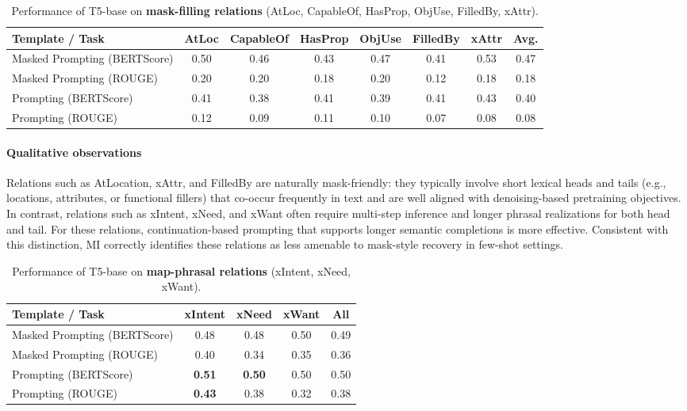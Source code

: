 \documentclass{i4c-en}
\begin{document}
	
	
	\begin{table}[t]
		\centering
		\small
		\begin{tabular}{l|cccccc|c}
			\toprule
			\textbf{Template / Task} & AtLoc & CapableOf & HasProp & ObjUse & FilledBy & xAttr & Avg. \\
			\midrule
			Masked Prompting (BERTScore) & 0.50 & 0.46 & 0.43 & 0.47 & 0.41 & 0.53 & 0.47 \\
			Masked Prompting (ROUGE)     & 0.20 & 0.20 & 0.18 & 0.20 & 0.12 & 0.18 & 0.18 \\
			Prompting (BERTScore) & 0.41 & 0.38 & 0.41 & 0.39 & 0.41 & 0.43 & 0.40 \\
			Prompting (ROUGE)     & 0.12 & 0.09 & 0.11 & 0.10 & 0.07 & 0.08 & 0.08 \\
			\bottomrule
		\end{tabular}
		\caption{Performance of T5-base on \textbf{mask-filling relations} (AtLoc, CapableOf, HasProp, ObjUse, FilledBy, xAttr).}
		\label{tab:mask_filling}
	\end{table}
	
	
	\paragraph{Qualitative observations}
Relations such as AtLocation, xAttr, and FilledBy are naturally mask-friendly: they typically involve short lexical heads and tails (e.g., locations, attributes, or functional fillers) that co-occur frequently in text and are well aligned with denoising-based pretraining objectives. In contrast, relations such as xIntent, xNeed, and xWant often require multi-step inference and longer phrasal realizations for both head and tail. For these relations, continuation-based prompting that supports longer semantic completions is more effective. Consistent with this distinction, MI correctly identifies these relations as less amenable to mask-style recovery in few-shot settings.

\begin{table}[t]
	\centering
	\small
	\begin{tabular}{l|ccc|c}
		\toprule
		\textbf{Template / Task} & xIntent & xNeed & xWant & All \\
		\midrule
		Masked Prompting (BERTScore) & 0.48 & 0.48 & 0.50 & 0.49 \\
		Masked Prompting (ROUGE)     & 0.40 & 0.34 & 0.35 & 0.36 \\
		Prompting (BERTScore) & \textbf{0.51} & \textbf{0.50} & 0.50 & 0.50 \\
		Prompting (ROUGE)     & \textbf{0.43} & 0.38 & 0.32 & 0.38 \\
		\bottomrule
	\end{tabular}
	\caption{Performance of T5-base on \textbf{map-phrasal relations} (xIntent, xNeed, xWant).}
	\label{tab:map_phrasal}
\end{table}
\end{document}
